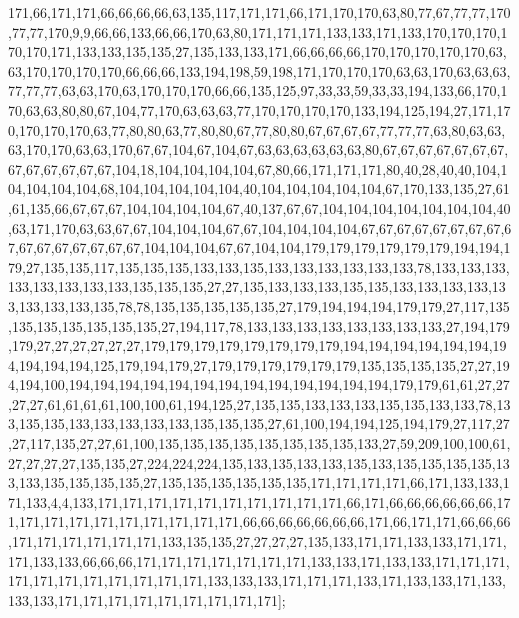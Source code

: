 171,66,171,171,66,66,66,66,63,135,117,171,171,66,171,170,170,63,80,77,67,77,77,170,77,77,170,9,9,66,66,133,66,66,170,63,80,171,171,171,133,133,171,133,170,170,170,170,170,171,133,133,135,135,27,135,133,133,171,66,66,66,66,170,170,170,170,170,63,63,170,170,170,170,66,66,66,133,194,198,59,198,171,170,170,170,63,63,170,63,63,63,77,77,77,63,63,170,63,170,170,170,66,66,135,125,97,33,33,59,33,33,194,133,66,170,170,63,63,80,80,67,104,77,170,63,63,63,77,170,170,170,170,133,194,125,194,27,171,170,170,170,170,63,77,80,80,63,77,80,80,67,77,80,80,67,67,67,67,77,77,77,63,80,63,63,63,170,170,63,63,170,67,67,104,67,104,67,63,63,63,63,63,63,80,67,67,67,67,67,67,67,67,67,67,67,67,67,104,18,104,104,104,104,67,80,66,171,171,171,80,40,28,40,40,104,104,104,104,104,68,104,104,104,104,104,40,104,104,104,104,104,67,170,133,135,27,61,61,135,66,67,67,67,104,104,104,104,67,40,137,67,67,104,104,104,104,104,104,104,40,63,171,170,63,63,67,67,104,104,104,67,67,104,104,104,104,67,67,67,67,67,67,67,67,67,67,67,67,67,67,67,67,104,104,104,67,67,104,104,179,179,179,179,179,179,194,194,179,27,135,135,117,135,135,135,133,133,135,133,133,133,133,133,133,78,133,133,133,133,133,133,133,133,135,135,135,27,27,135,133,133,133,135,135,133,133,133,133,133,133,133,133,135,78,78,135,135,135,135,135,27,179,194,194,194,179,179,27,117,135,135,135,135,135,135,135,27,194,117,78,133,133,133,133,133,133,133,133,27,194,179,179,27,27,27,27,27,27,179,179,179,179,179,179,179,179,194,194,194,194,194,194,194,194,194,194,125,179,194,179,27,179,179,179,179,179,179,135,135,135,135,27,27,194,194,100,194,194,194,194,194,194,194,194,194,194,194,194,194,179,179,61,61,27,27,27,27,61,61,61,61,100,100,61,194,125,27,135,135,133,133,133,135,135,133,133,78,133,135,135,133,133,133,133,133,135,135,135,27,61,100,194,194,125,194,179,27,117,27,27,117,135,27,27,61,100,135,135,135,135,135,135,135,135,133,27,59,209,100,100,61,27,27,27,27,135,135,27,224,224,224,135,133,135,133,133,135,133,135,135,135,135,133,133,135,135,135,135,27,135,135,135,135,135,135,171,171,171,171,66,171,133,133,171,133,4,4,133,171,171,171,171,171,171,171,171,171,171,66,171,66,66,66,66,66,66,171,171,171,171,171,171,171,171,171,171,66,66,66,66,66,66,66,171,66,171,171,66,66,66,171,171,171,171,171,171,133,135,135,27,27,27,27,135,133,171,171,133,133,171,171,171,133,133,66,66,66,171,171,171,171,171,171,171,133,133,171,133,133,171,171,171,171,171,171,171,171,171,171,171,133,133,133,171,171,171,133,171,133,133,171,133,133,133,171,171,171,171,171,171,171,171,171];

